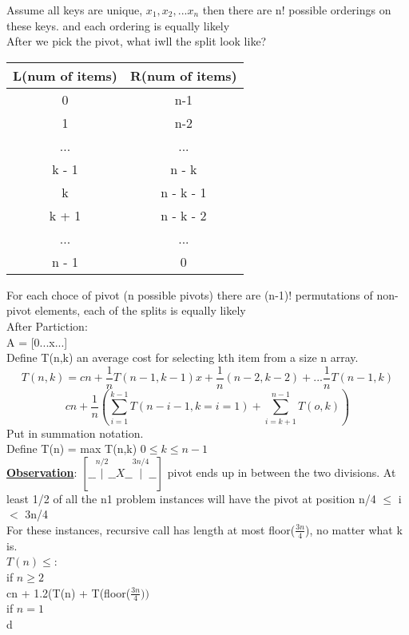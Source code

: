 \documentclass[12pt]{article}
\newcommand{\myt}[1]{\textbf{\underline{#1}}}
\begin{document}
	Assume all keys are unique, $x_1, x_2,...x_n$ then there are n! possible orderings on these keys. and each ordering is equally likely\\
	
	After we pick the pivot, what iwll the split look like?\\
	\begin{tabular}{c | c}
		L(num of items) & R(num of items) \\ \hline
		0 & n-1 \\
		1 & n-2 \\
		... & ...\\
		k - 1 & n - k\\
		k & n - k - 1 \\
		k + 1 & n - k - 2\\
		... & ... \\
		n - 1 & 0 \\
	\end{tabular} 
	
	For each choce of pivot (n possible pivots) there are (n-1)! permutations of non-pivot elements, each of the splits is equally likely\\
	
	After Partiction:\\
	A = [0...x...]\\
	Define T(n,k) an average cost for selecting kth item from a size n array.\\
	
	$$T(n,k) = cn + \frac{1}{n}T(n-1, k-1)x + \frac{1}{n}(n-2, k-2) + ... \frac{1}{n}T(n-1, k)$$
	$$cn + \frac{1}{n}(\sum_{i=1}^{k-1}T(n-i-1, k=i=1) + \sum_{i=k+1}^{n-1}T(o,k))$$
	Put in summation notation.\\
	
	Define T(n) = max T(n,k) $0 \leq k \leq n-1$\\
	
	\myt{Observation}:
	$[\_\_\overset{n/2}{|}\_\_X\_\_\overset{3n/4}{|}\_\_]$
	pivot ends up in between the two divisions. At least 1/2 of all the n1 problem instances will have the pivot at position n/4 $\leq$ i $<$ 3n/4\\
	
	For these instances, recursive call has length at most floor($\frac{3n}{4}$), no matter what k is.\\
	
	$T(n) \leq $:\\
	if $n \geq 2$\\
	cn + 1.2(T(n) + T(floor($\frac{3n}{4}))$\\
	if $n = 1$\\
	d\\
	
\end{document}
